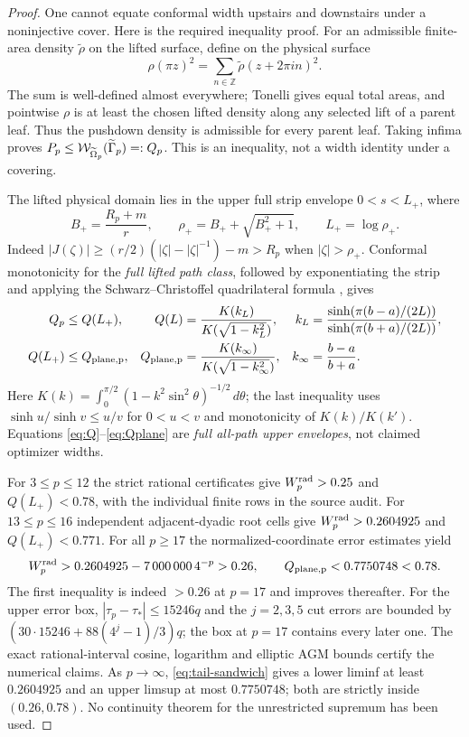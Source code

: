 \begin{proof}
One cannot equate conformal
width upstairs and downstairs
under a noninjective cover.
Here is the required
inequality proof.
For an admissible finite-area
density $\widetilde\rho$
on the lifted surface, define
on the physical surface
\begin{equation}\label{eq:period}
 \rho(\pi z)^2=
 \sum_{n\in\mathbb Z}
 \widetilde\rho(z+2\pi i n)^2.
\end{equation}
The sum is well-defined
almost everywhere; Tonelli
gives equal total areas,
and pointwise $\rho$ is at
least the chosen lifted
density along any selected
lift of a parent leaf.
Thus the pushdown density
is admissible for every
parent leaf.  Taking
infima proves
$P_p\le\mathcal W_{\widetilde{\Omega}_p}
(\widetilde\Gamma_p)=:Q_p$.
This is an inequality, not
a width identity under
a covering.

The lifted physical
domain lies in the
upper full strip envelope
$0<s<L_+$, where
\[
 B_+=\frac{R_p+m}{r},\qquad
 \rho_+=B_++\sqrt{B_+^2+1},\qquad
 L_+=\log\rho_+.
\]
Indeed $|J(\zeta)|\ge
(r/2)(|\zeta|-|\zeta|^{-1})-m
>R_p$ when $|\zeta|>\rho_+$.
Conformal monotonicity
for the \emph{full lifted
path class}, followed by
exponentiating the strip
and applying the
Schwarz--Christoffel
quadrilateral formula
\cite[Chapter I, \S\S1--4]{AhlforsInvariants},
gives
\begin{align}
 Q_p&\le Q(L_+),&
 Q(L)&=\frac{K(k_L)}{K(\sqrt{1-k_L^2})},&
 k_L&=\frac{\sinh(\pi(b-a)/(2L))}
             {\sinh(\pi(b+a)/(2L))},\label{eq:Q}\\
 Q(L_+)&\le Q_{\rm plane,p},&
 Q_{\rm plane,p}&=\frac{K(k_\infty)}
                       {K(\sqrt{1-k_\infty^2})},&
 k_\infty&=\frac{b-a}{b+a}.\label{eq:Qplane}
\end{align}
Here $K(k)=\int_0^{\pi/2}
(1-k^2\sin^2\theta)^{-1/2}\,d\theta$;
the last inequality uses
$\sinh u/\sinh v\le u/v$
for $0<u<v$ and
monotonicity of $K(k)/K(k')$.
Equations \eqref{eq:Q}--\eqref{eq:Qplane}
are \emph{full all-path
upper envelopes}, not
claimed optimizer widths.

For $3\le p\le12$
the strict rational certificates
give $W_p^{\rm rad}>0.25$
and $Q(L_+)<0.78$,
with the individual finite
rows in the source audit.
For $13\le p\le16$
independent adjacent-dyadic
root cells give
$W_p^{\rm rad}>0.2604925$
and $Q(L_+)<0.771$.
For all $p\ge17$
the normalized-coordinate
error estimates yield
\begin{equation}\label{eq:tail-sandwich}
 W_p^{\rm rad}>
 0.2604925-7\,000\,000\,4^{-p}>0.26,\qquad
 Q_{\rm plane,p}<0.7750748<0.78.
\end{equation}
The first inequality is
indeed $>0.26$ at $p=17$
and improves thereafter.
For the upper error box,
$|\tau_p-\tau_*|\le15246q$
and the $j=2,3,5$ cut
errors are bounded by
$(30\cdot15246+88(4^j-1)/3)q$;
the box at $p=17$
contains every later one.
The exact rational-interval
cosine, logarithm and
elliptic AGM bounds
certify the numerical
claims.  As $p\to\infty$,
\eqref{eq:tail-sandwich}
gives a lower liminf at
least $0.2604925$ and
an upper limsup at most
$0.7750748$; both are
strictly inside $(0.26,0.78)$.
No continuity theorem
for the unrestricted
supremum has been used.
\end{proof}

